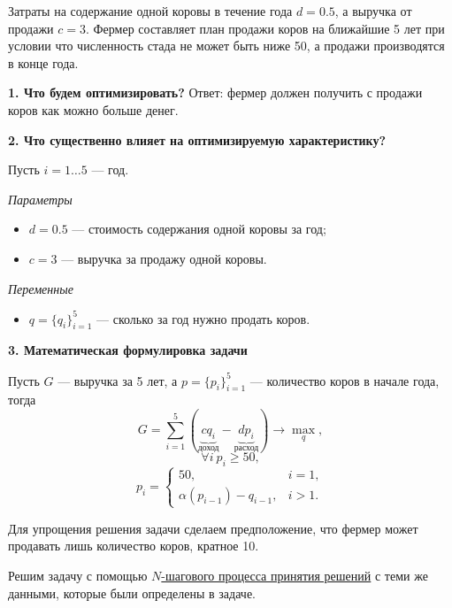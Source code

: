 Затраты на содержание одной коровы в течение года $d = 0.5$, а выручка от продажи $c = 3$. Фермер составляет план продажи коров на ближайшие 5 лет при условии что численность стада не может быть ниже 50, а продажи производятся в конце года.

\mathmodel

\textbf{1. Что будем оптимизировать?} Ответ: фермер должен получить с продажи коров как можно больше денег.

\bigskip

\textbf{2. Что существенно влияет на оптимизируемую характеристику?}

Пусть $i = 1 \dots 5$ --- год.

\bigskip

\textit{Параметры}

\begin{itemize}[nosep]
	\item $d = 0.5$ --- стоимость содержания одной коровы за год;
	
	\item $c = 3$ --- выручка за продажу одной коровы.
\end{itemize}

\bigskip

\textit{Переменные}

\begin{itemize}[nosep]	
	\item $q = \{q_i\}_{i=1}^5$ --- сколько за год нужно продать коров.
\end{itemize}

\bigskip

\textbf{3. Математическая формулировка задачи}

Пусть $G$ --- выручка за 5 лет, а $p = \{p_i\}_{i=1}^5$ --- количество коров в начале года, тогда
\[G = \sum_{i=1}^{5} (\underbrace{c q_i}_{\text{доход}} - \underbrace{d p_i}_{\text{расход}}) \to \max_{q},\]
\[\forall  i \ p_i \ge 50,\]
\[p_i = \begin{cases}\tag{*}
	50,& i = 1, \\
	\alpha(p_{i - 1}) - q_{i - 1},& i > 1.
\end{cases}
\]

\solution

Для упрощения решения задачи сделаем предположение, что фермер может продавать лишь количество коров, кратное 10.

Решим задачу с помощью \hyperref[alg:n_step_process]{$N$-шагового процесса принятия решений} с теми же данными, которые были определены в задаче.


